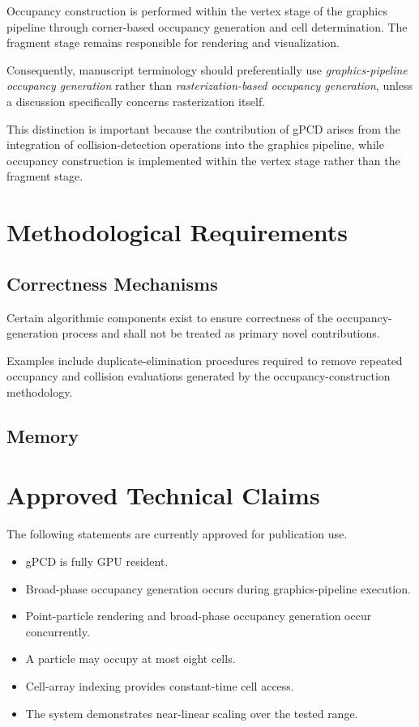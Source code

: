 Occupancy construction is performed within the vertex stage of the
graphics pipeline through corner-based occupancy generation and cell
determination. The fragment stage remains responsible for rendering and
visualization.

Consequently, manuscript terminology should preferentially use
\emph{graphics-pipeline occupancy generation} rather than
\emph{rasterization-based occupancy generation}, unless a discussion
specifically concerns rasterization itself.

This distinction is important because the contribution of gPCD arises
from the integration of collision-detection operations into the graphics
pipeline, while occupancy construction is implemented within the vertex
stage rather than the fragment stage.
\section{Methodological Requirements}

\subsection{Correctness Mechanisms}

Certain algorithmic components exist to ensure correctness of the
occupancy-generation process and shall not be treated as primary
novel contributions.

Examples include duplicate-elimination procedures required to
remove repeated occupancy and collision evaluations generated by
the occupancy-construction methodology.

\subsection{Memory}

\section{Approved Technical Claims}

The following statements are currently approved for publication use.

\begin{itemize}
\item gPCD is fully GPU resident.
\item Broad-phase occupancy generation occurs during graphics-pipeline execution.
\item Point-particle rendering and broad-phase occupancy generation occur concurrently.
\item A particle may occupy at most eight cells.
\item Cell-array indexing provides constant-time cell access.
\item The system demonstrates near-linear scaling over the tested range.
\end{itemize}

